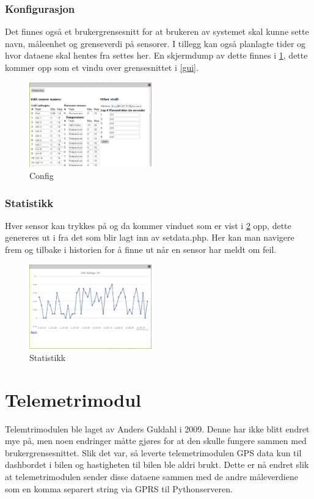 \subsubsection{Konfigurasjon}
Det finnes også et brukergrensesnitt for at brukeren av systemet skal kunne sette navn, måleenhet og grenseverdi på sensorer. I tillegg kan også planlagte tider og hvor dataene skal hentes fra settes her.
En skjermdump av dette finnes i \ref{config}, dette kommer opp som et vindu over grensesnittet i \ref{gui}.
\begin{figure}[H]
\caption{Config} 
\label{config}
\includegraphics[width=200px]{images/config.png}
\end{figure}

\subsubsection{Statistikk}
Hver sensor kan trykkes på og da kommer vinduet som er vist i \ref{stats} opp, dette genereres ut i fra det som blir lagt inn av setdata.php. Her kan man navigere frem og tilbake i historien for å finne ut når en sensor har meldt om feil.
\begin{figure}[H]
\caption{Statistikk} 
\label{stats}
\includegraphics[width=200px]{images/stat.png}
\end{figure}
\section{Telemetrimodul}
Telemtrimodulen ble laget av Anders Guldahl \cite{telemetrithesis} i 2009. Denne har ikke blitt endret mye på, men noen endringer måtte gjøres for at den skulle fungere sammen med brukergrensesnittet.
Slik det var, så leverte telemetrimodulen GPS data kun til dashbordet i bilen og hastigheten til bilen ble aldri brukt. Dette er nå endret slik at telemetrimodulen sender disse dataene sammen med de andre måleverdiene som en komma separert string via GPRS til Pythonserveren.
